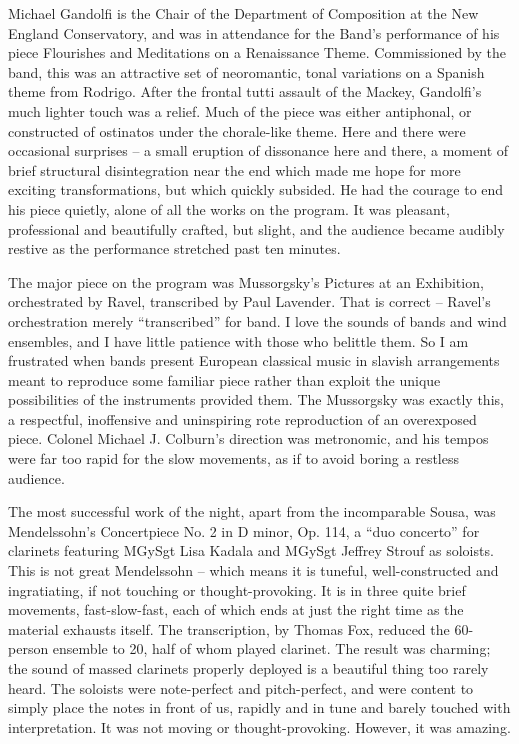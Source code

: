 Michael Gandolfi is the Chair of the Department of Composition at the New England Conservatory, and was in attendance for the Band’s performance of his piece Flourishes and Meditations on a Renaissance Theme. Commissioned by the band, this was an attractive set of neoromantic, tonal variations on a Spanish theme from Rodrigo. After the frontal tutti assault of the Mackey, Gandolfi’s much lighter touch was a relief. Much of the piece was either antiphonal, or constructed of ostinatos under the chorale-like theme. Here and there were occasional surprises – a small eruption of dissonance here and there, a moment of brief structural disintegration near the end which made me hope for more exciting transformations, but which quickly subsided. He had the courage to end his piece quietly, alone of all the works on the program. It was pleasant, professional and beautifully crafted, but slight, and the audience became audibly restive as the performance stretched past ten minutes.

The major piece on the program was Mussorgsky’s Pictures at an Exhibition, orchestrated by Ravel, transcribed by Paul Lavender. That is correct – Ravel’s orchestration merely “transcribed” for band. I love the sounds of bands and wind ensembles, and I have little patience with those who belittle them. So I am frustrated when bands present European classical music in slavish arrangements meant to reproduce some familiar piece rather than exploit the unique possibilities of the instruments provided them. The Mussorgsky was exactly this, a respectful, inoffensive and uninspiring rote reproduction of an overexposed piece. Colonel Michael J. Colburn’s direction was metronomic, and his tempos were far too rapid for the slow movements, as if to avoid boring a restless audience.

The most successful work of the night, apart from the incomparable Sousa, was Mendelssohn’s Concertpiece No. 2 in D minor, Op. 114, a “duo concerto” for clarinets featuring MGySgt Lisa Kadala and MGySgt Jeffrey Strouf as soloists. This is not great Mendelssohn – which means it is tuneful, well-constructed and ingratiating, if not touching or thought-provoking. It is in three quite brief movements, fast-slow-fast, each of which ends at just the right time as the material exhausts itself. The transcription, by Thomas Fox, reduced the 60-person ensemble to 20, half of whom played clarinet. The result was charming; the sound of massed clarinets properly deployed is a beautiful thing too rarely heard. The soloists were note-perfect and pitch-perfect, and were content to simply place the notes in front of us, rapidly and in tune and barely touched with interpretation. It was not moving or thought-provoking. However, it was amazing.
